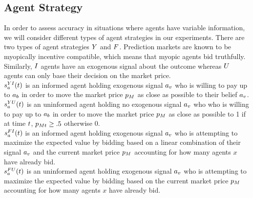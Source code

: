 \subsection{Agent Strategy}
In order to assess accuracy in situations where agents have variable information, we will consider different types of agent strategies in our experiments. There are two types of agent strategies  $Y$ and  $F$. Prediction markets are known to be myopically incentive compatible, which means that myopic agents bid truthfully. Similarly,  $I$ agents have an exogenous signal about the outcome whereas  $U$ agents can only base their decision on the market price. \\

$s^{YI}_a(t)$ is an informed agent holding exogenous signal $a_v$ who is willing to pay up to $a_b$ in order to move the market price $p_M$ as close as possible to their belief $a_v$. \\

$s^{YU}_a(t)$ is an uninformed agent holding no exogenous signal $a_v$ who who is willing to pay up to $a_b$ in order to move the market price $p_M$ as close as possible to 1 if at time $t$, $p_{Mt} \ge .5$ otherwise 0. \\

$s^{FI}_a(t)$ is an informed agent holding exogenous signal $a_v$ who is attempting to maximize the expected value by bidding based on a linear combination of their signal $a_v$ and the current market price $p_M$ accounting for how many agents $x$ have already bid. \\

$s^{FU}_a(t)$ is an uninformed agent holding exogenous signal $a_v$ who is attempting to maximize the expected value by bidding based on the current market price $p_M$ accounting for how many agents $x$ have already bid. \\

